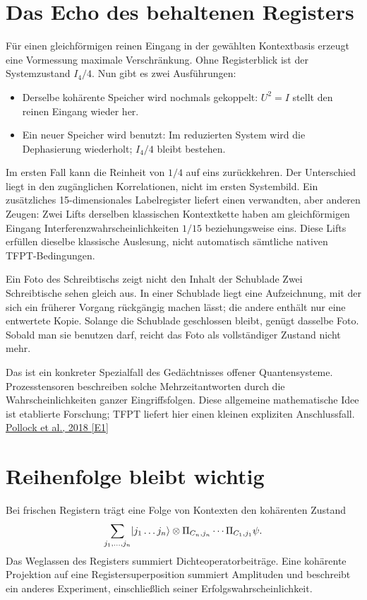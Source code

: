 \section{Das Echo des behaltenen Registers}
Für einen gleichförmigen reinen Eingang in der gewählten Kontextbasis erzeugt eine Vormessung maximale Verschränkung. Ohne Registerblick ist der Systemzustand $I_4/4$. Nun gibt es zwei Ausführungen:
\begin{itemize}
\item Derselbe kohärente Speicher wird nochmals gekoppelt: $U^2=I$ stellt den reinen Eingang wieder her.
\item Ein neuer Speicher wird benutzt: Im reduzierten System wird die Dephasierung wiederholt; $I_4/4$ bleibt bestehen.
\end{itemize}
Im ersten Fall kann die Reinheit von $1/4$ auf eins zurückkehren. Der Unterschied liegt in den zugänglichen Korrelationen, nicht im ersten Systembild. Ein zusätzliches 15-dimensionales Labelregister liefert einen verwandten, aber anderen Zeugen: Zwei Lifts derselben klassischen Kontextkette haben am gleichförmigen Eingang Interferenzwahrscheinlichkeiten $1/15$ beziehungsweise eins. Diese Lifts erfüllen dieselbe klassische Auslesung, nicht automatisch sämtliche nativen TFPT-Bedingungen. 

\begin{bild}{Ein Foto des Schreibtischs zeigt nicht den Inhalt der Schublade}
Zwei Schreibtische sehen gleich aus. In einer Schublade liegt eine Aufzeichnung, mit der sich ein früherer Vorgang rückgängig machen lässt; die andere enthält nur eine entwertete Kopie. Solange die Schublade geschlossen bleibt, genügt dasselbe Foto. Sobald man sie benutzen darf, reicht das Foto als vollständiger Zustand nicht mehr.
\end{bild}

Das ist ein konkreter Spezialfall des Gedächtnisses offener Quantensysteme. Prozesstensoren beschreiben solche Mehrzeitantworten durch die Wahrscheinlichkeiten ganzer Eingriffsfolgen. Diese allgemeine mathematische Idee ist etablierte Forschung; TFPT liefert hier einen kleinen expliziten Anschlussfall. \href{https://arxiv.org/abs/1512.00589}{Pollock et al., 2018 [E1]}

\section{Reihenfolge bleibt wichtig}
Bei frischen Registern trägt eine Folge von Kontexten den kohärenten Zustand
\begin{equation}
\sum_{j_1,\ldots,j_n}\lvert j_1\ldots j_n\rangle\otimes
\Pi_{C_n,j_n}\cdots\Pi_{C_1,j_1}\psi.
\end{equation}
Das Weglassen des Registers summiert Dichteoperatorbeiträge. Eine kohärente Projektion auf eine Registersuperposition summiert Amplituden und beschreibt ein anderes Experiment, einschließlich seiner Erfolgswahrscheinlichkeit.

